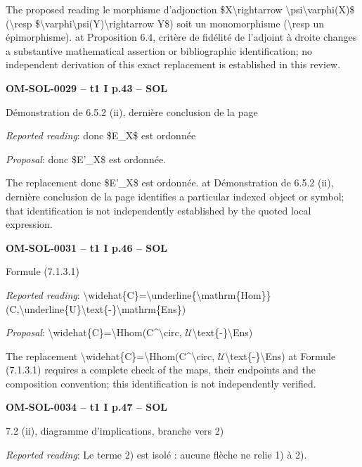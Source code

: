 The proposed reading le morphisme d'adjonction \$X\textbackslash{}rightarrow \textbackslash{}psi\textbackslash{}varphi(X)\$ (\textbackslash{}resp \$\textbackslash{}varphi\textbackslash{}psi(Y)\textbackslash{}rightarrow Y\$) soit un monomorphisme (\textbackslash{}resp un épimorphisme). at Proposition 6.4, critère de fidélité de l'adjoint à droite changes a substantive mathematical assertion or bibliographic identification; no independent derivation of this exact replacement is established in this review.\par
\par\noindent\textbf{OM-SOL-0029 -- t1 I p.43 -- SOL}\par
Démonstration de 6.5.2 (ii), dernière conclusion de la page\par
\emph{Reported reading}: donc \$E\_X\$ est ordonnée\par
\emph{Proposal}: donc \$E'\_X\$ est ordonnée.\par
The replacement donc \$E'\_X\$ est ordonnée. at Démonstration de 6.5.2 (ii), dernière conclusion de la page identifies a particular indexed object or symbol; that identification is not independently established by the quoted local expression.\par
\par\noindent\textbf{OM-SOL-0031 -- t1 I p.46 -- SOL}\par
Formule (7.1.3.1)\par
\emph{Reported reading}: \textbackslash{}widehat\{C\}=\allowbreak \textbackslash{}underline\{\textbackslash{}mathrm\{Hom\}\}(C,\textbackslash{}underline\{U\}\textbackslash{}text\{-\}\textbackslash{}mathrm\{Ens\})\par
\emph{Proposal}: \textbackslash{}widehat\{C\}=\allowbreak \textbackslash{}Hhom(C\textasciicircum{}\textbackslash{}circ, \ensuremath{𝒰}\textbackslash{}text\{-\}\textbackslash{}Ens)\par
The replacement \textbackslash{}widehat\{C\}=\allowbreak \textbackslash{}Hhom(C\textasciicircum{}\textbackslash{}circ, \ensuremath{𝒰}\textbackslash{}text\{-\}\textbackslash{}Ens) at Formule (7.1.3.1) requires a complete check of the maps, their endpoints and the composition convention; this identification is not independently verified.\par
\par\noindent\textbf{OM-SOL-0034 -- t1 I p.47 -- SOL}\par
7.2 (ii), diagramme d'implications, branche vers 2)\par
\emph{Reported reading}: Le terme 2) est isolé : aucune flèche ne relie 1) à 2).\par
